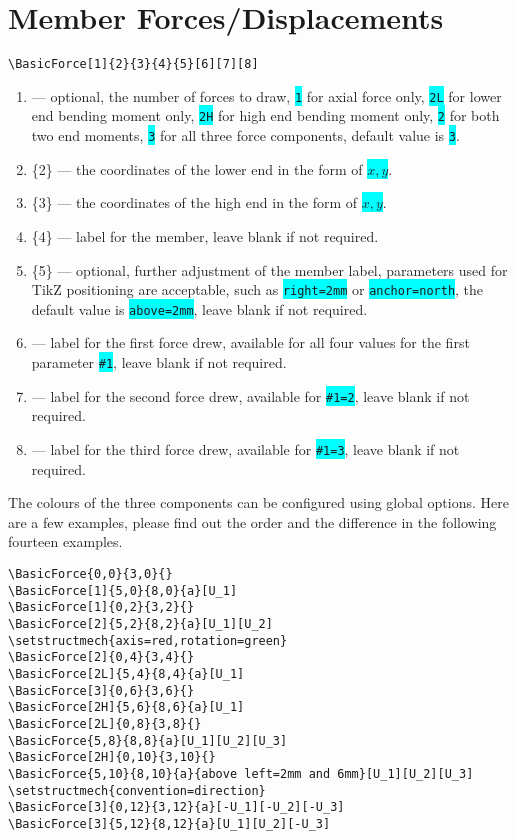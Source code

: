 \documentclass[10pt,a4paper]{article}
\newcommand*{\Highlight}[1]{\colorbox{cyan}{\color{red}\texttt{#1}}}
\begin{document}
\section{Member Forces/Displacements}
\begin{Verbatim}[frame=single,label=Syntax]
\BasicForce[1]{2}{3}{4}{5}[6][7][8]
\end{Verbatim}
\begin{enumerate}
\item[][1] --- optional, the number of forces to draw, \Highlight{1} for axial force only, \Highlight{2L} for lower end bending moment only, \Highlight{2H} for high end bending moment only, \Highlight{2} for both two end moments, \Highlight{3} for all three force components, default value is \Highlight{3}.
\item[]\{2\} --- the coordinates of the lower end in the form of \Highlight{$x,y$}.
\item[]\{3\} --- the coordinates of the high end in the form of \Highlight{$x,y$}.
\item[]\{4\} --- label for the member, leave blank if not required.
\item[]\{5\} --- optional, further adjustment of the member label, parameters used for TikZ positioning are acceptable, such as \Highlight{right=2mm} or \Highlight{anchor=north}, the default value is \Highlight{above=2mm}, leave blank if not required.
\item[][6] --- label for the first force drew, available for all four values for the first parameter \Highlight{\#1}, leave blank if not required.
\item[][7] --- label for the second force drew, available for \Highlight{\#1=2}, leave blank if not required.
\item[][8] --- label for the third force drew, available for \Highlight{\#1=3}, leave blank if not required.
\end{enumerate}
The colours of the three components can be configured using global options. Here are a few examples, please find out the order and the difference in the following fourteen examples.
\begin{Verbatim}[frame=single,label=Example]
\BasicForce{0,0}{3,0}{}
\BasicForce[1]{5,0}{8,0}{a}[U_1]
\BasicForce[1]{0,2}{3,2}{}
\BasicForce[2]{5,2}{8,2}{a}[U_1][U_2]
\setstructmech{axis=red,rotation=green}
\BasicForce[2]{0,4}{3,4}{}
\BasicForce[2L]{5,4}{8,4}{a}[U_1]
\BasicForce[3]{0,6}{3,6}{}
\BasicForce[2H]{5,6}{8,6}{a}[U_1]
\BasicForce[2L]{0,8}{3,8}{}
\BasicForce{5,8}{8,8}{a}[U_1][U_2][U_3]
\BasicForce[2H]{0,10}{3,10}{}
\BasicForce{5,10}{8,10}{a}{above left=2mm and 6mm}[U_1][U_2][U_3]
\setstructmech{convention=direction}
\BasicForce[3]{0,12}{3,12}{a}[-U_1][-U_2][-U_3]
\BasicForce[3]{5,12}{8,12}{a}[U_1][U_2][-U_3]
\end{Verbatim}
\end{document}
